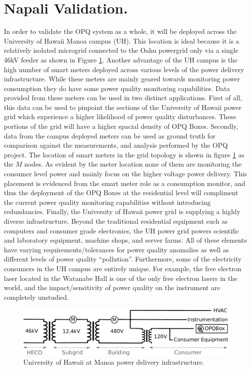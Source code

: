 \section{Napali Validation.}
In order to validate the OPQ system as a whole, it will be deployed across the University of Hawaii Manoa campus (UH). This location is ideal because it is a relatively isolated microgrid connected to the Oahu powergrid only via a single 46kV feeder as shown in Figure \ref{expdes:fig:1}. Another advantage of the UH campus is the high number of smart meters deployed across various levels of the power delivery infrastructure. While these meters are mainly geared towards monitoring power consumption they do have some power quality monitoring capabilities. Data provided from these meters can be used in two distinct applications. First of all, this data can be used to pinpoint the sections of the University of Hawaii power grid which experience a higher likelihood of power quality disturbances. These portions of the grid will have a higher spacial density of OPQ Boxes. Secondly, data from the campus deployed meters can be used as ground truth for comparison against the measurements, and analysis performed by the OPQ project. The location of smart meters in the grid topology is shown in figure \ref{expdes:fig:1} as the $M$ nodes. As evident by the meter location none of them are monitoring the consumer level power and mainly focus on the higher voltage power delivery. This placement is evidenced from the smart meter role as a consumption monitor, and thus the deployment of the OPQ Boxes at the residential level will compliment the current power quality monitoring capabilities without introducing redundancies. Finally, the University of Hawaii power grid is supplying a highly diverse infrastructure. Beyond the traditional residential equipment such as computers and consumer grade electronics, the UH power grid powers scientific and laboratory equipment, machine shops, and server farms. All of these elements have varying requirements/tolerances for power quality anomalies as well as different levels of power quality ``pollution''. Furthermore, some of the electricity consumers in the UH campus are entirely unique. For example, the free electron laser located in the Watanabe Hall is one of the only free electron lasers in the world, and the impact/sensitivity of power quality on the instrument are completely unstudied.
\begin{figure}[h]
	\centering
	\includegraphics[width=1\linewidth]{img/uh-grid.pdf}	
	\caption{University of Hawaii at Manoa power delivery infrastructure.}
	\label{expdes:fig:1}
\end{figure}

